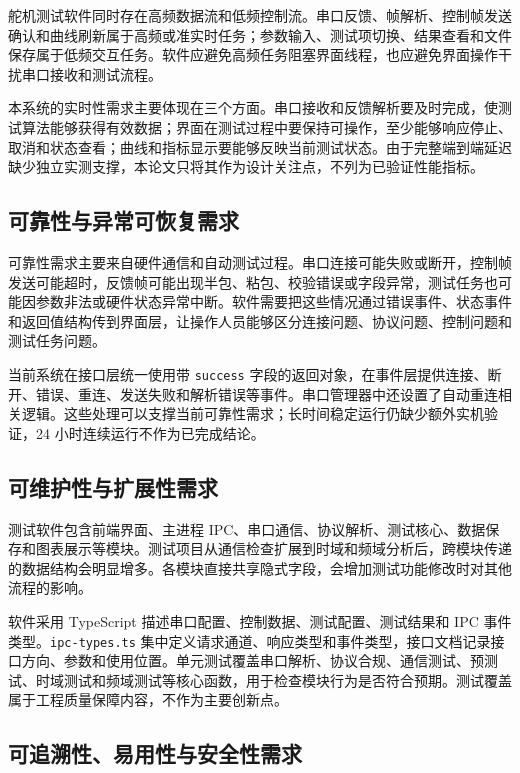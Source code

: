 舵机测试软件同时存在高频数据流和低频控制流。串口反馈、帧解析、控制帧发送确认和曲线刷新属于高频或准实时任务；参数输入、测试项切换、结果查看和文件保存属于低频交互任务。软件应避免高频任务阻塞界面线程，也应避免界面操作干扰串口接收和测试流程。

本系统的实时性需求主要体现在三个方面。串口接收和反馈解析要及时完成，使测试算法能够获得有效数据；界面在测试过程中要保持可操作，至少能够响应停止、取消和状态查看；曲线和指标显示要能够反映当前测试状态。由于完整端到端延迟缺少独立实测支撑，本论文只将其作为设计关注点，不列为已验证性能指标。

\subsection{可靠性与异常可恢复需求}

可靠性需求主要来自硬件通信和自动测试过程。串口连接可能失败或断开，控制帧发送可能超时，反馈帧可能出现半包、粘包、校验错误或字段异常，测试任务也可能因参数非法或硬件状态异常中断。软件需要把这些情况通过错误事件、状态事件和返回值结构传到界面层，让操作人员能够区分连接问题、协议问题、控制问题和测试任务问题。

当前系统在接口层统一使用带 \texttt{success} 字段的返回对象，在事件层提供连接、断开、错误、重连、发送失败和解析错误等事件。串口管理器中还设置了自动重连相关逻辑。这些处理可以支撑当前可靠性需求；长时间稳定运行仍缺少额外实机验证，24 小时连续运行不作为已完成结论。

\subsection{可维护性与扩展性需求}

测试软件包含前端界面、主进程 IPC、串口通信、协议解析、测试核心、数据保存和图表展示等模块。测试项目从通信检查扩展到时域和频域分析后，跨模块传递的数据结构会明显增多。各模块直接共享隐式字段，会增加测试功能修改时对其他流程的影响。

软件采用 TypeScript 描述串口配置、控制数据、测试配置、测试结果和 IPC 事件类型。\texttt{ipc-types.ts} 集中定义请求通道、响应类型和事件类型，接口文档记录接口方向、参数和使用位置。单元测试覆盖串口解析、协议合规、通信测试、预测试、时域测试和频域测试等核心函数，用于检查模块行为是否符合预期。测试覆盖属于工程质量保障内容，不作为主要创新点。

\subsection{可追溯性、易用性与安全性需求}


